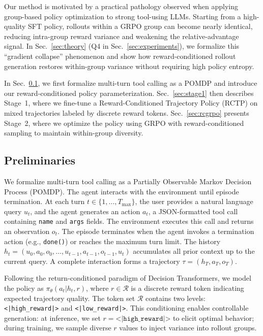 \documentclass{article}
\theoremstyle{plain}
\theoremstyle{definition}
\theoremstyle{remark}
\begin{document}
Our method is motivated by a practical pathology observed when applying group-based policy optimization to strong tool-using LLMs. Starting from a high-quality SFT policy, rollouts within a GRPO group can become nearly identical, reducing intra-group reward variance and weakening the relative-advantage signal. In Sec.~\ref{sec:theory} (Q4 in Sec.~\ref{sec:experiments}), we formalize this ``gradient collapse'' phenomenon and show how reward-conditioned rollout generation restores within-group variance without requiring high policy entropy.

In Sec.~\ref{sec:preliminaries}, we first formalize multi-turn tool calling as a POMDP and introduce our reward-conditioned policy parameterization.
Sec.~\ref{sec:stage1} then describes Stage~1, where we fine-tune a Reward-Conditioned Trajectory Policy (RCTP) on mixed trajectories labeled by discrete reward tokens.
Sec.~\ref{sec:rcgrpo} presents Stage~2, where we optimize the policy using GRPO with reward-conditioned sampling to maintain within-group diversity.

\subsection{Preliminaries}
\label{sec:preliminaries}
We formalize multi-turn tool calling as a Partially Observable Markov Decision Process (POMDP). The agent interacts with the environment until episode termination. At each turn $t \in \{1, \ldots, T_{\text{max}}\}$, the user provides a natural language query $u_t$, and the agent generates an action $a_t$, a JSON-formatted tool call containing \texttt{name} and \texttt{args} fields. The environment executes this call and returns an observation $o_t$. The episode terminates when the agent invokes a termination action (e.g., \texttt{done()}) or reaches the maximum turn limit. The history $h_t = (u_0, a_0, o_0, \dots, u_{t-1}, a_{t-1}, o_{t-1}, u_t)$ accumulates all prior context up to the current query. A complete interaction forms a trajectory $\tau = (h_T, a_T, o_T)$.

Following the return-conditioned paradigm of Decision Transformers, we model the policy as $\pi_\theta(a_t | h_t, r)$, where $r \in \mathcal{R}$ is a discrete reward token indicating expected trajectory quality. The token set $\mathcal{R}$ contains two levels: \texttt{<|high\_reward|>} and \texttt{<|low\_reward|>}. This conditioning enables controllable generation: at inference, we set $r = \texttt{<|high\_reward|>}$ to elicit optimal behavior; during training, we sample diverse $r$ values to inject variance into rollout groups.
\end{document}
